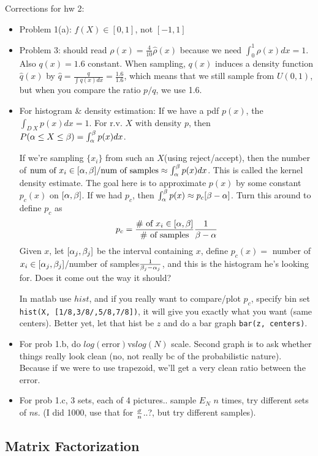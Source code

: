 Corrections for hw 2:
\begin{itemize}
\item Problem 1(a): $f(X) \in [0,1]$, not $[-1,1]$
\item Problem 3: should read $\rho(x) = \frac{4}{10}\hat \rho(x)$
  because we need $\int_0^1\rho(x)dx = 1$. Also $q(x)=1.6$
  constant. When sampling, $q(x)$ induces a density function $\hat
  q(x)$ by $\hat q = \frac{q}{\int q(x)dx}=\frac{1.6}{1.6}$, which means that we
  still sample from $U(0,1)$, but when you compare the ratio $p/q$, we
  use 1.6.
\item For histogram \& density estimation: If we have a pdf $p(x)$,
  the $\int_{D~X}p(x)dx = 1$. For r.v. $X$ with density $p$, then
  $P(\alpha \le X\le \beta) = \int_\alpha^\beta p(x)dx$. 

If we're sampling $\{x_i\}$ from such an $X$(using reject/accept), then the number of $\text{num of
}x_i \in [\alpha,\beta]/\text{num of samples} \approx \int_\alpha^\beta
p(x)dx$. This is called the kernel density estimate. The goal here is
to approximate $p(x)$ by some constant $p_c(x)$ on $[\alpha, \beta]$. If
we had $p_c$, then $\int_\alpha^\beta p(x) \approx p_c[\beta-\alpha]$. Turn
this around to define $p_c$ as 
$$p_c = \frac{\text{\# of }x_i\in[\alpha, \beta]}{\text{\# of
    samples}}\frac{1}{\beta-\alpha}$$
Given $x$, let $[\alpha_j, \beta_j]$ be the interval containing $x$,
define $p_c(x)=$ number of $x_i\in[\alpha_j,\beta_j]$/number of
samples$\frac{1}{\beta_j-\alpha_j}$, and this is the histogram he's looking for.
Does it come out the way it should?

In matlab use $hist$, and if you really want to compare/plot $p_c$,
specify bin set \texttt{hist(X, [1/8,3/8/,5/8,7/8])}, it will give you
exactly what you want (same centers). Better yet, let that hist be $z$
and do a bar graph \texttt{bar(z, centers)}.
\item For prob 1.b, do $log(\text{error})$vs$log(N)$ scale. Second
  graph is to ask whether things really look clean (no, not really bc
  of the probabilistic nature). Because if we were
  to use trapezoid, we'll get a very clean ratio between the error.
\item For prob 1.c, 3 sets, each of 4 pictures.. sample $E_N$ $n$
  times, try different sets of $n$s. (I did 1000, use that for
  $\frac{\sigma}{n}$..?, but try different samples).
\end{itemize}

\subsection{Matrix Factorization}
\label{sec:matrix}

